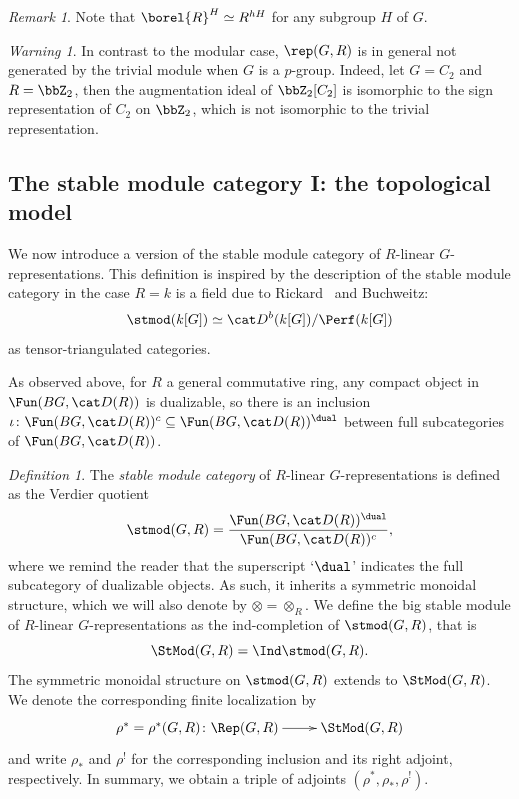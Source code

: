 \documentclass{amsart}%
\numberwithin{equation}{section}%
\theoremstyle{remark}
\newtheorem{Def}[equation]{Definition}
\newtheorem{Warn}[equation]{Warning}
\newtheorem{Rem}[equation]{Remark}
\begin{document}
\begin{Rem}
Note that $\borel{R}^H \simeq R^{hH}$ for any subgroup $H$ of $G$. 
\end{Rem}

\begin{Warn}\label{warn:generation}
In contrast to the modular case, $\rep(G,R)$ is in general not generated by the trivial module when $G$ is a $p$-group. Indeed, let $G=C_2$ and $R = \bbZ_2$, then the augmentation ideal of $\bbZ_2[C_2]$ is isomorphic to the sign representation of $C_2$ on $\bbZ_2$, which is not isomorphic to the trivial representation. 
\end{Warn}


\subsection{The stable module category I: the topological model}

We now introduce a version of the stable module category of $R$-linear $G$-representations. This definition is inspired by the description of the stable module category in the case $R=k$ is a field due to Rickard~\cite{Rickard89} and Buchweitz:
\[
\stmod(k[G]) \simeq \cat D^b(k[G])/\Perf(k[G])
\]
as tensor-triangulated categories.

As observed above, for $R$ a general commutative ring, any compact object in $\Fun(BG,\cat D(R))$ is dualizable, so there is an inclusion $\iota\colon \Fun(BG,\cat D(R))^c \subseteq \Fun(BG,\cat D(R))^{\dual}$ between full subcategories of $\Fun(BG,\cat D(R))$.

\begin{Def}\label{def:stmod}
The \emph{stable module category} of $R$-linear $G$-representations is defined as the Verdier quotient
\begin{equation}\label{eq:rickardquotient}
    \stmod(G,R) = \frac{\Fun(BG,\cat D(R))^{\dual}}{\Fun(BG,\cat D(R))^c},
\end{equation}
where we remind the reader that the superscript `$\dual$' indicates the full subcategory of dualizable objects. As such, it inherits a symmetric monoidal structure, which we will also denote by $\otimes = \otimes_R$. We define the big stable module of $R$-linear $G$-representations as the ind-completion of $\stmod(G,R)$, that is
\[
\StMod(G,R) = \Ind\stmod(G,R).
\]
The symmetric monoidal structure on $\stmod(G,R)$ extends to $\StMod(G,R)$. We denote the corresponding finite localization by
\begin{equation}\label{eq:stmodquot}
    \xymatrix{\rho^* = \rho^*(G,R)\colon \Rep(G,R) \ar[r] & \StMod(G,R)}
\end{equation}
and write $\rho_*$ and $\rho^!$ for the corresponding inclusion and its right adjoint, respectively. In summary, we obtain a triple of adjoints $(\rho^*,\rho_*,\rho^!)$.
\end{Def}
\end{document}

